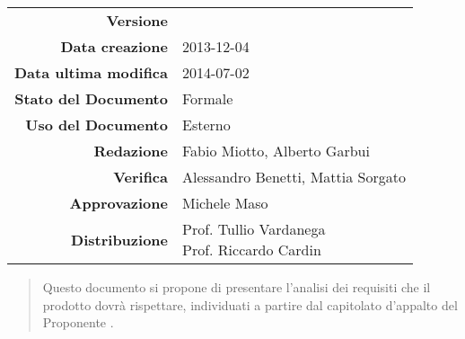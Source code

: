 

\newcommand{\Versione}{\versioneAnalisiDeiRequisiti{}}	%
\newcommand{\Data}{2013-12-04}							%
\newcommand{\DataUltimaModifica}{2014-07-02}
\newcommand{\TipoDocumento}{Analisi dei Requisiti}		%






\begin{center}
\begin{tabular}{r|l}
\textbf{Versione} & \Versione{} \\
\textbf{Data creazione} & \Data{} \\
\textbf{Data ultima modifica} & \DataUltimaModifica{} \\
\textbf{Stato del Documento} & Formale \\					%
\textbf{Uso del Documento} & Esterno \\						%
\textbf{Redazione} & Fabio Miotto, Alberto Garbui\\			%
\textbf{Verifica} & Alessandro Benetti, Mattia Sorgato\\	%
\textbf{Approvazione} & Michele Maso\\					    %
\textbf{Distribuzione} & \parbox[t]{4cm}{Prof. Tullio Vardanega \\ Prof. Riccardo Cardin \\ \Prop{} }\\
\end{tabular}
\end{center}

\vspace{0.05in}

\begin{abstract}
\begin{center}
Questo documento si propone di presentare l'analisi dei requisiti che il prodotto \Progetto{} dovrà rispettare, individuati a partire dal capitolato d'appalto del Proponente \Prop{}.
\end{center}
\end{abstract}

